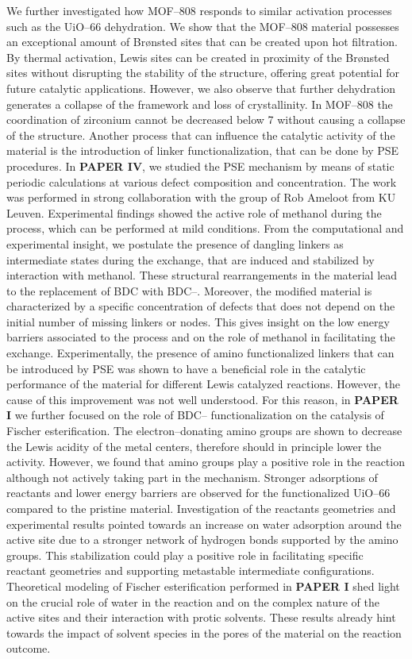 We further investigated how MOF--808 responds to similar activation processes such as the UiO--66 dehydration. We show that the MOF--808 material possesses an exceptional amount of Br\o{}nsted sites that can be created upon hot filtration. By thermal activation, Lewis sites can be created in proximity of the Br\o{}nsted sites without disrupting the stability of the structure, offering great potential for future catalytic applications. However, we also observe that further dehydration generates a collapse of the framework and loss of crystallinity. In MOF--808 the coordination of zirconium cannot be decreased below 7 without causing a collapse of the structure.
\npar
Another process that can influence the catalytic activity of the material is the introduction of linker functionalization, that can be done by PSE procedures. In \textbf{PAPER IV}, we studied the PSE mechanism by means of static periodic calculations at various defect composition and concentration. The work was performed in strong collaboration with the group of Rob Ameloot from KU Leuven. Experimental findings showed the active role of methanol during the process, which can be performed at mild conditions. From the computational and experimental insight, we postulate the presence of dangling linkers as intermediate states during the exchange, that are induced and stabilized by interaction with methanol. These structural rearrangements in the material lead to the replacement of BDC with BDC--. Moreover, the modified material is characterized by a specific concentration of defects that does not depend on the initial number of missing linkers or nodes. This gives insight on the low energy barriers associated to the process and on the role of methanol in facilitating the exchange. 
\npar
Experimentally, the presence of amino functionalized linkers that can be introduced by PSE was shown to have a beneficial role in the catalytic performance of the material for different Lewis catalyzed reactions. However, the cause of this improvement was not well understood. For this reason, in \textbf{PAPER I} we further focused on the role of BDC-- functionalization on the catalysis of Fischer esterification. The electron--donating amino groups are shown to decrease the Lewis acidity of the metal centers, therefore should in principle lower the activity. However, we found that amino groups play a positive role in the reaction although not actively taking part in the mechanism. Stronger adsorptions of reactants and lower energy barriers are observed for the functionalized UiO--66 compared to the pristine material. Investigation of the reactants geometries and experimental results pointed towards an increase on water adsorption around the active site due to a stronger network of hydrogen bonds supported by the amino groups. This stabilization could play a positive role in facilitating specific reactant geometries and supporting metastable intermediate configurations. Theoretical modeling of Fischer esterification performed in \textbf{PAPER I} shed light on the crucial role of water in the reaction and on the complex nature of the active sites and their interaction with protic solvents. These results already hint towards the impact of solvent species in the pores of the material on the reaction outcome.
